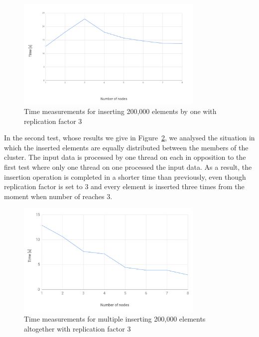         \begin{figure}[ht]
            \centering
            \includegraphics[width=0.8\textwidth]{thesis/figures/rf3.png}
            \caption{Time measurements for inserting 200,000 elements by one \Node with replication factor 3}
            \label{rf3}
        \end{figure}
        
        In the second test, whose results we give in Figure~\ref{mrf3}, we analysed the situation in which the inserted elements are equally distributed between the members of the cluster. The input data is processed by one thread on each \Node in opposition to the first test where only one thread on one \Node processed the input data. As a result, the insertion operation is completed in a shorter time than previously, even though replication factor is set to 3 and every element is inserted three times from the moment when
        number of \Nodes reaches 3.
    
    \begin{figure}[H]
        \centering
        \includegraphics[width=0.8\textwidth]{thesis/figures/rf3MultipleInserts.png}
        \caption{Time measurements for multiple \Nodes inserting 200,000 elements altogether with replication factor 3}
        \label{mrf3}
    \end{figure}


